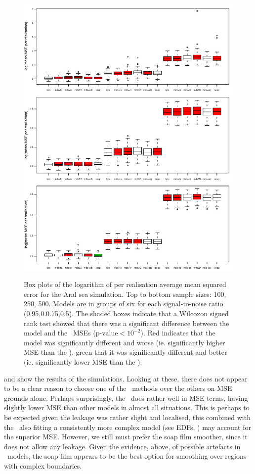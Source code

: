 {%
\begin{figure}
\centering
\includegraphics[width=6in]{mds/figs/big-aral-boxplot.pdf} \\
\caption{Box plots of the logarithm of per realisation average mean squared error for the Aral sea simulation. Top to bottom sample sizes: 100, 250, 500. Models are in groups of six for each signal-to-noise ratio (0.95,0.0.75,0.5). The shaded boxes indicate that a Wilcoxon signed rank test showed that there was a significant difference between the model and the \tprs\ MSEs ($\text{p-value} < 10^{-2}$). Red indicates that the model was significantly different and worse (ie. significantly higher MSE than the \tprs), green that it was significantly different and better (ie. significantly lower MSE than the \tprs).}
\label{big-aral-mses}
\end{figure}

 and  show the results of the simulations. Looking at these, there does not appear to be a clear reason to choose one of the \mdsap\ methods over the others on MSE grounds alone. Perhaps surprisingly, the \tprs\ does rather well in MSE terms, having slightly lower MSE than other models in almost all situations. This is perhaps to be expected given the leakage was rather slight and localised, this combined with the \tprs\ also fitting a consistently more complex model (see EDFs, ) may account for the superior MSE. However, we still must prefer the soap film smoother, since it does not allow any leakage. Given the evidence, above, of possible artefacts in \mdsap\ models, the soap film appears to be the best option for smoothing over regions with complex boundaries.

}
